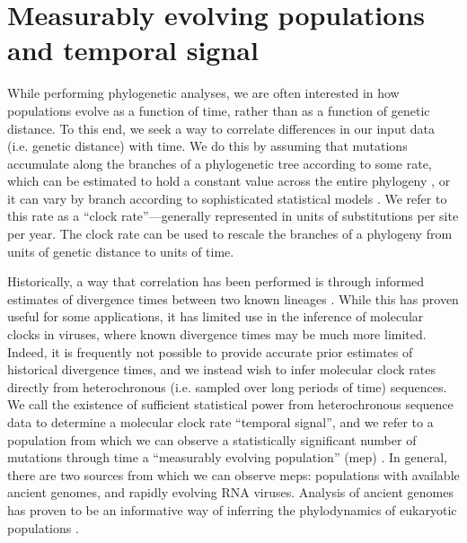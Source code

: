 \section{Measurably evolving populations and temporal signal}

While performing phylogenetic analyses, we are often interested in how populations evolve as a function of time, rather than as a function of genetic distance.
To this end, we seek a way to correlate differences in our input data (i.e. genetic distance) with time.
We do this by assuming that mutations accumulate along the branches of a phylogenetic tree according to some rate, which can be estimated to hold a constant value across the entire phylogeny \cite{strictClockPaper}, or it can vary by branch according to sophisticated statistical models \cite{unocrrelatedRelaxedClocks, randomLocalClocks}.
We refer to this rate as a ``clock rate''---generally represented in units of substitutions per site per year.
The clock rate can be used to rescale the branches of a phylogeny from units of genetic distance to units of time.

Historically, a way that correlation has been performed is through informed estimates of divergence times between two known lineages \cite{humanApeDivergence}. %
While this has proven useful for some applications, %
it has limited use in the inference of molecular clocks in viruses, where known divergence times may be much more limited.
Indeed, it is frequently not possible to provide accurate prior estimates of historical divergence times, and we instead wish to infer molecular clock rates directly from heterochronous (i.e. sampled over long periods of time) sequences.
We call the existence of sufficient statistical power from heterochronous sequence data to determine a molecular clock rate ``temporal signal'', and we refer to a population from which we can observe a statistically significant number of mutations through time a ``measurably evolving population'' (\gls{mep}) \cite{drummond2003MEP}. %
In general, there are two sources from which we can observe \gls{mep}s: populations with available ancient genomes, and rapidly evolving RNA viruses.
Analysis of ancient genomes has proven to be an informative way of inferring the phylodynamics of eukaryotic populations \cite{shapiro2004bison}. %



